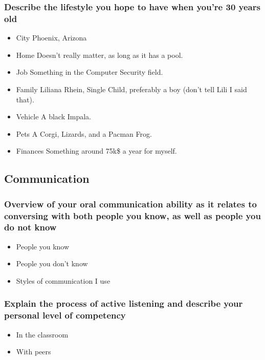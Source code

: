 \documentclass[11pt]{article}
\begin{document}
\subsubsection*{Describe the lifestyle you hope to have when you're 30 years old}
\label{sec:orgc52dc76}
\begin{itemize}
\item City
\label{sec:orgb6c323c}
Phoenix, Arizona
\item Home
\label{sec:orgec76b2c}
Doesn't really matter, as long as it has a pool.
\item Job
\label{sec:org890b11f}
Something in the Computer Security field.
\item Family
\label{sec:org3ad959b}
Liliana Rhein, Single Child, preferably a boy (don't tell Lili I said that).
\item Vehicle
\label{sec:org97cb1e8}
A black Impala.
\item Pets
\label{sec:org6587e4b}
A Corgi, Lizards, and a Pacman Frog.
\item Finances
\label{sec:org44a0a0b}
Something around 75k\$ a year for myself.
\end{itemize}
\subsection*{Communication}
\label{sec:orgd9f983c}
\subsubsection*{Overview of your oral communication ability as it relates to conversing with both people you know, as well as people you do not know}
\label{sec:org36d015d}
\begin{itemize}
\item People you know
\label{sec:orgc004411}
\item People you don't know
\label{sec:orge7daa62}
\item Styles of communication I use
\label{sec:orgf085a7b}
\end{itemize}
\subsubsection*{Explain the process of active listening and describe your personal level of competency}
\label{sec:org9f7b218}
\begin{itemize}
\item In the classroom
\label{sec:orge7fb14a}
\item With peers
\label{sec:org6f5bf20}
\end{itemize}
\end{document}
